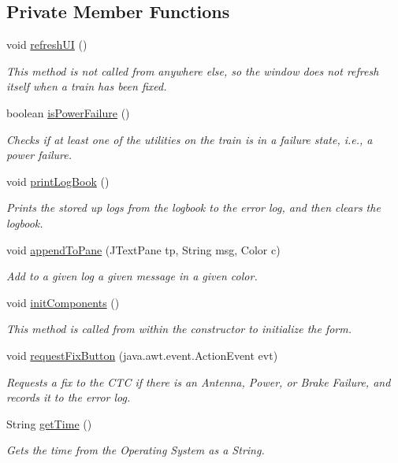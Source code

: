 \subsection*{Private Member Functions}
\begin{DoxyCompactItemize}
\item 
void \hyperlink{classTrainControllerComps_1_1TCFailures_ac2b39b97af1de62e3c73a74d2b7a20e1}{refresh\+UI} ()
\begin{DoxyCompactList}\small\item\em This method is not called from anywhere else, so the window does not refresh itself when a train has been fixed. \end{DoxyCompactList}\item 
boolean \hyperlink{classTrainControllerComps_1_1TCFailures_ab4d70425a3e693a1e21462deb74c8d6b}{is\+Power\+Failure} ()
\begin{DoxyCompactList}\small\item\em Checks if at least one of the utilities on the train is in a failure state, i.\+e., a power failure. \end{DoxyCompactList}\item 
void \hyperlink{classTrainControllerComps_1_1TCFailures_a0e826ca632b3289ad5b68ca93bb2fd11}{print\+Log\+Book} ()
\begin{DoxyCompactList}\small\item\em Prints the stored up logs from the logbook to the error log, and then clears the logbook. \end{DoxyCompactList}\item 
void \hyperlink{classTrainControllerComps_1_1TCFailures_a258e2032358c8398ea01b0feab32bcd6}{append\+To\+Pane} (J\+Text\+Pane tp, String msg, Color c)
\begin{DoxyCompactList}\small\item\em Add to a given log a given message in a given color. \end{DoxyCompactList}\item 
void \hyperlink{classTrainControllerComps_1_1TCFailures_abb8526b0ea750ed8d0570ae2e42713f8}{init\+Components} ()
\begin{DoxyCompactList}\small\item\em This method is called from within the constructor to initialize the form. \end{DoxyCompactList}\item 
void \hyperlink{classTrainControllerComps_1_1TCFailures_a16da0e026327d523cdcb1f4b9286e30a}{request\+Fix\+Button} (java.\+awt.\+event.\+Action\+Event evt)
\begin{DoxyCompactList}\small\item\em Requests a fix to the C\+TC if there is an Antenna, Power, or Brake Failure, and records it to the error log. \end{DoxyCompactList}\item 
String \hyperlink{classTrainControllerComps_1_1TCFailures_aeed3df89a5204c89c00e75174f8722aa}{get\+Time} ()
\begin{DoxyCompactList}\small\item\em Gets the time from the Operating System as a String. \end{DoxyCompactList}\end{DoxyCompactItemize}
